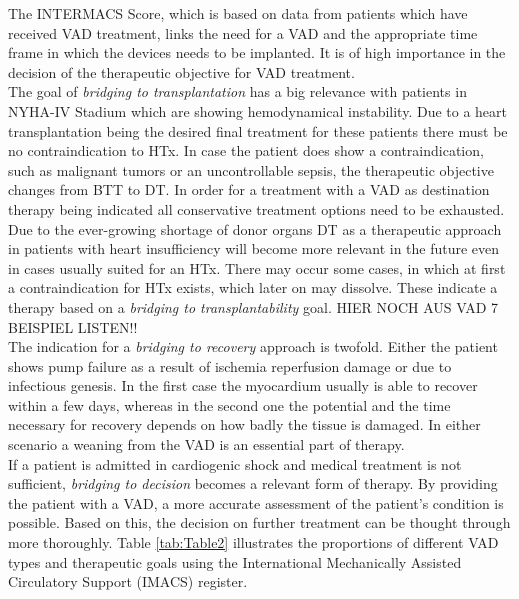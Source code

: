 The INTERMACS Score, which is based on data from patients which have received VAD treatment, links the need for a VAD and the appropriate time frame in which the devices needs to be implanted. It is of high importance in the decision of the therapeutic objective for VAD treatment. \cite{VAD7}
\\The goal of \textit{bridging to transplantation} has a big relevance with patients in NYHA-IV Stadium which are showing hemodynamical instability. Due to a heart transplantation being the desired final treatment for these patients there must be no contraindication to HTx. In case the patient does show a contraindication, such as malignant tumors or an uncontrollable sepsis, the therapeutic objective changes from BTT to DT. In order for a treatment with a VAD as destination therapy being indicated all conservative treatment options need to be exhausted. Due to the ever-growing shortage of donor organs DT as a therapeutic approach in patients with heart insufficiency will become more relevant in the future even in cases usually suited for an HTx. \cite{VAD7} There may occur some cases, in which at first a contraindication for HTx exists, which later on may dissolve. These indicate a therapy based on a \textit{bridging to transplantability} goal. \cite{VAD6} HIER NOCH AUS VAD 7 BEISPIEL LISTEN!!
\\The indication for a \textit{bridging to recovery} approach is twofold. Either the patient shows pump failure as a result of ischemia reperfusion damage or due to infectious genesis. In the first case the myocardium usually is able to recover within a few days, whereas in the second one the potential and the time necessary for recovery depends on how badly the tissue is damaged. In either scenario a weaning from the VAD is an essential part of therapy. \cite{VAD7}
\\If a patient is admitted in cardiogenic shock and medical treatment is not sufficient, \textit{bridging to decision} becomes a relevant form of therapy. By providing the patient with a VAD, a more accurate assessment of the patient's condition is possible.
Based on this, the decision on further treatment can be thought through more thoroughly. \cite{VAD6} Table \ref{tab:Table2} illustrates the proportions of different VAD types and therapeutic goals using the International Mechanically Assisted Circulatory Support (IMACS) register.
